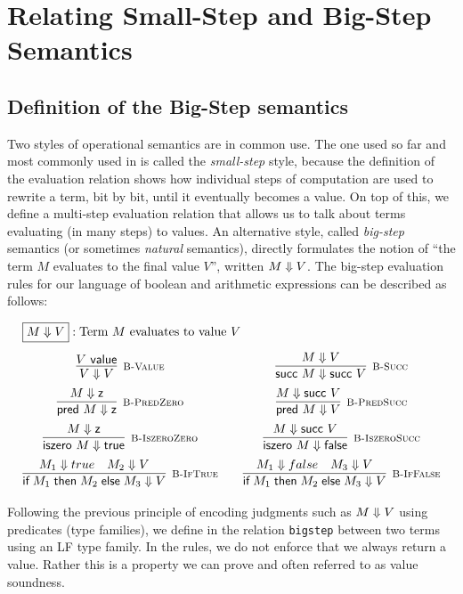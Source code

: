 \section{Relating Small-Step and Big-Step Semantics}
\label{sec:small-to-big}
\subsection{Definition of the Big-Step semantics}

Two styles of operational semantics are in common use. The one used so far and
most commonly used in \cite{TAPL} is called the {\em small-step} style, because
the definition of the evaluation relation shows how individual steps of
computation are used to rewrite a term, bit by bit, until it eventually becomes
a value. On top of this, we define a multi-step evaluation relation that allows
us to talk about terms evaluating (in many steps) to values. An alternative
style, called {\em big-step} semantics (or sometimes {\em natural} semantics),
directly formulates the notion of ``the term $M$ evaluates to the final value $V$'',
written $M \Downarrow V$. The big-step evaluation rules for our language of
boolean and arithmetic expressions can be described as follows:

\[
\begin{array}{c@{\qquad}c}
\multicolumn{2}{l}{\fbox{$M \BSteps V$}: \mbox{Term $M$ evaluates to value $V$}}\\[1em]
  \infer[\BValue]{V \BSteps V}{V \Value} &
  \infer[\BSucc]{\tmsucc M \BSteps \tmsucc V}{M \BSteps V}
\\[0.5em]
  \infer[\BPredZero]{\tmpred M \BSteps \tmzero}{M \BSteps \tmzero} &
  \infer[\BPredSucc]{\tmpred M \BSteps V}{M \BSteps \tmsucc V}
\\[0.5em]
  \infer[\BIszeroZero]{\tmiszero M \BSteps \tmtrue} {M \BSteps \tmzero} &
  \infer[\BIszeroSucc]{\tmiszero M \BSteps \tmfalse}{M \BSteps \tmsucc V}
\\[0.5em]
  \infer[\BIfTrue] {\tmif {M_1}{M_2}{M_3} \BSteps V}{M_1 \BSteps true  & M_2 \BSteps V} &
  \infer[\BIfFalse]{\tmif {M_1}{M_2}{M_3} \BSteps V}{M_1 \BSteps false & M_3 \BSteps V} \\
\end{array}
\]

Following the previous principle of encoding judgments such as $M \Downarrow V$
using predicates (type families), we define in \beluga the relation
\lstinline!bigstep! between two terms using an LF type family. In the rules, we
do not enforce that we always return a value. Rather this is a property we can
prove and often referred to as value soundness.

